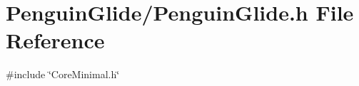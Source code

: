 \section{Penguin\+Glide/\+Penguin\+Glide.h File Reference}
\label{_penguin_glide_8h}
{\ttfamily \#include \char`\"{}Core\+Minimal.\+h\char`\"{}}\newline
